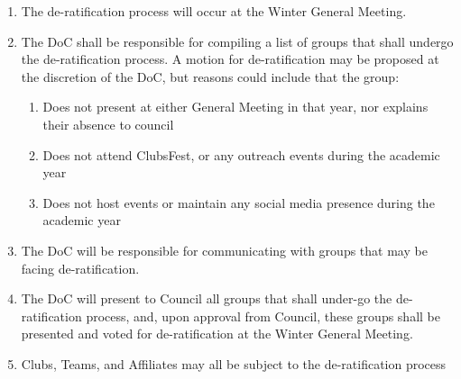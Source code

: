 \begin{enumerate}
 \item
  The de-ratification process will occur at the Winter General Meeting.
 \item
  The DoC shall be responsible for compiling a list of groups that shall undergo the de-ratification process. A motion for de-ratification may be proposed at the discretion of the DoC, but reasons could include that the group:

  \begin{enumerate}
   \item
    Does not present at either General Meeting in that year, nor explains their absence to council
   \item
    Does not attend ClubsFest, or any outreach events during the academic year
   \item
    Does not host events or maintain any social media presence during the academic year
  \end{enumerate}
 \item
  The DoC will be responsible for communicating with groups that may be facing de-ratification.
 \item
  The DoC will present to Council all groups that shall under-go the de-ratification process, and, upon approval from Council, these groups shall be presented and voted for de-ratification at the Winter General Meeting.
 \item
  Clubs, Teams, and Affiliates may all be subject to the de-ratification process
\end{enumerate}
% 
